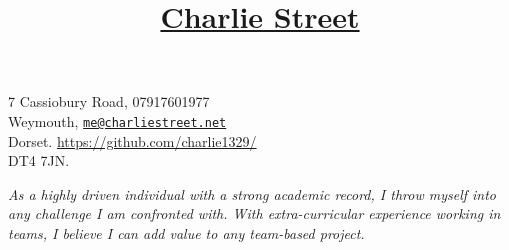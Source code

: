\documentclass[11pt]{article}
\title{\vspace{-80pt}\underline{Charlie Street}}
\date{}
\begin{document}
	\maketitle
	\vspace*{-60pt}
	\begin{flushleft}
	\noindent
	\large 7 Cassiobury Road,
	\hfill
	\large 07917601977 \\
	\large Weymouth,
	\hfill 
	\large \href{mailto:me@charliestreet.net}{\nolinkurl{me@charliestreet.net}} \\
	\large Dorset. 
	\hfill
	\large
	\url{https://github.com/charlie1329/}\\
	\large DT4 7JN. \\
	\end{flushleft}

	\vspace{-15pt}
	\begin{center}
			\textit{\large As a highly driven individual with a strong academic record, I throw myself into any challenge I am confronted with. With extra-curricular experience working in teams, I believe I can add value to any team-based project.}
	\end{center}
			
\end{document}
